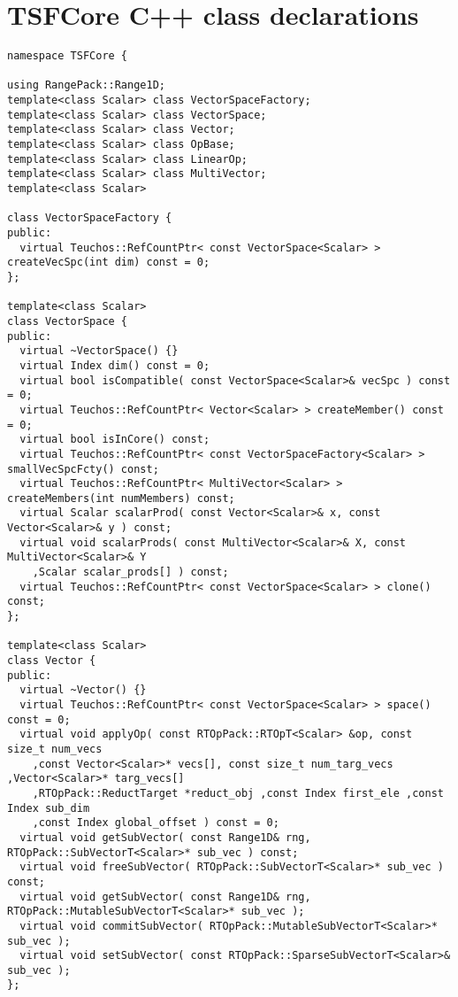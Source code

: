 %
\section{TSFCore C++ class declarations}
\label{app:tsfcore_classes}
%

{\scriptsize\begin{verbatim}
namespace TSFCore {

using RangePack::Range1D;
template<class Scalar> class VectorSpaceFactory;
template<class Scalar> class VectorSpace;
template<class Scalar> class Vector;
template<class Scalar> class OpBase;
template<class Scalar> class LinearOp;
template<class Scalar> class MultiVector;
template<class Scalar>

class VectorSpaceFactory {
public:
  virtual Teuchos::RefCountPtr< const VectorSpace<Scalar> > createVecSpc(int dim) const = 0;
};

template<class Scalar>
class VectorSpace {
public:
  virtual ~VectorSpace() {}
  virtual Index dim() const = 0;
  virtual bool isCompatible( const VectorSpace<Scalar>& vecSpc ) const = 0;
  virtual Teuchos::RefCountPtr< Vector<Scalar> > createMember() const = 0;
  virtual bool isInCore() const;
  virtual Teuchos::RefCountPtr< const VectorSpaceFactory<Scalar> > smallVecSpcFcty() const;
  virtual Teuchos::RefCountPtr< MultiVector<Scalar> > createMembers(int numMembers) const;
  virtual Scalar scalarProd( const Vector<Scalar>& x, const Vector<Scalar>& y ) const;
  virtual void scalarProds( const MultiVector<Scalar>& X, const MultiVector<Scalar>& Y
    ,Scalar scalar_prods[] ) const;
  virtual Teuchos::RefCountPtr< const VectorSpace<Scalar> > clone() const;
};

template<class Scalar>
class Vector {
public:
  virtual ~Vector() {}
  virtual Teuchos::RefCountPtr< const VectorSpace<Scalar> > space() const = 0;
  virtual void applyOp( const RTOpPack::RTOpT<Scalar> &op, const size_t num_vecs
    ,const Vector<Scalar>* vecs[], const size_t num_targ_vecs ,Vector<Scalar>* targ_vecs[]
    ,RTOpPack::ReductTarget *reduct_obj ,const Index first_ele ,const Index sub_dim
    ,const Index global_offset ) const = 0;
  virtual void getSubVector( const Range1D& rng, RTOpPack::SubVectorT<Scalar>* sub_vec ) const;
  virtual void freeSubVector( RTOpPack::SubVectorT<Scalar>* sub_vec ) const;
  virtual void getSubVector( const Range1D& rng, RTOpPack::MutableSubVectorT<Scalar>* sub_vec );
  virtual void commitSubVector( RTOpPack::MutableSubVectorT<Scalar>* sub_vec );
  virtual void setSubVector( const RTOpPack::SparseSubVectorT<Scalar>& sub_vec );
};


\end{verbatim}}
